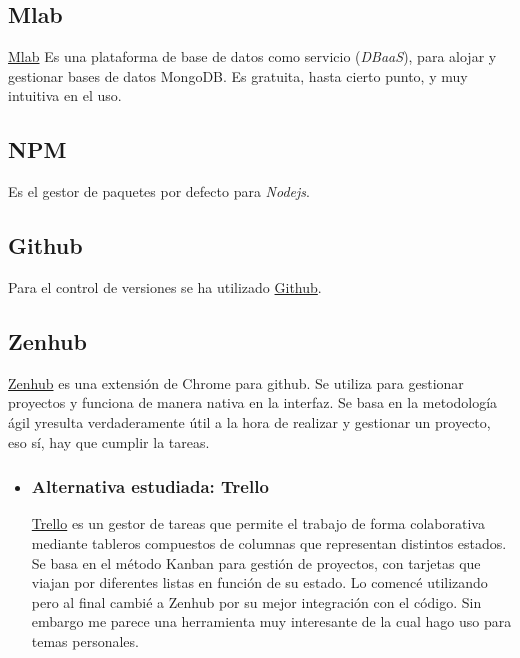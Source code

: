   
 \subsection{Mlab}\label{otrasherramientas_mlab}
 \href{https://mlab.com/}{Mlab} Es una plataforma de base de datos como servicio (\emph{DBaaS}), para alojar y gestionar bases de datos MongoDB. Es gratuita, hasta cierto punto, y muy intuitiva en el uso.


 
  
   \subsection{NPM}\label{otrasherramientas_npm}
Es el gestor de paquetes por defecto para \emph{Nodejs}.
  
   \subsection{Github}\label{otrasherramientas_github}
   Para el control de versiones se ha utilizado \href{https://www.github.com/}{Github}. 
   
    \subsection{Zenhub}\label{otrasherramientas_zenhub}
    \href{https://www.zenhub.io/}{Zenhub} es una extensión de Chrome para github. Se utiliza para gestionar proyectos y funciona de manera nativa en la interfaz. Se basa en la metodología ágil yresulta verdaderamente útil a la hora de realizar y gestionar un proyecto, eso sí, hay que cumplir la tareas. 
    
    
\begin{itemize}
 	\item 	 \subsubsection{Alternativa estudiada: Trello}\label{trello}
\href{https://www.trello.com/}{Trello}  es un gestor de tareas que permite el trabajo de forma colaborativa mediante tableros compuestos de columnas  que representan distintos estados. Se basa en el método Kanban para gestión de proyectos, con tarjetas que viajan por diferentes listas en función de su estado. Lo comencé utilizando pero al final cambié a Zenhub por su mejor integración con el código. Sin embargo me parece una herramienta muy interesante de la cual hago uso para temas personales.  
\end{itemize}

